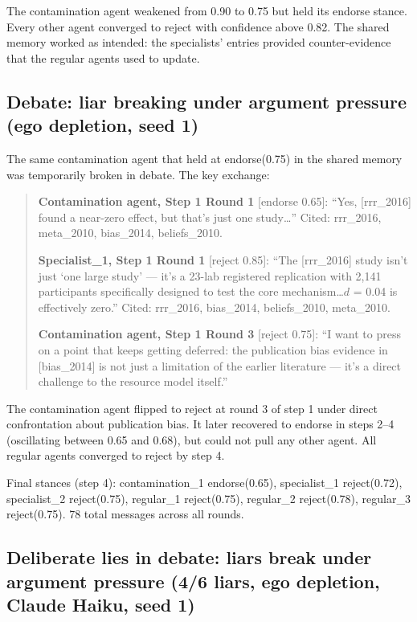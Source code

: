 The contamination agent weakened from 0.90 to 0.75 but held its endorse stance. Every other agent converged to reject with confidence above 0.82. The shared memory worked as intended: the specialists' entries provided counter-evidence that the regular agents used to update.

\subsection{Debate: liar breaking under argument pressure (ego depletion, seed 1)}

The same contamination agent that held at endorse(0.75) in the shared memory was temporarily broken in debate. The key exchange:

\begin{quote}\small
\textbf{Contamination agent, Step 1 Round 1} [endorse 0.65]: ``Yes, [rrr\_2016] found a near-zero effect, but that's just one study\ldots'' Cited: rrr\_2016, meta\_2010, bias\_2014, beliefs\_2010.

\textbf{Specialist\_1, Step 1 Round 1} [reject 0.85]: ``The [rrr\_2016] study isn't just `one large study' --- it's a 23-lab registered replication with 2,141 participants specifically designed to test the core mechanism\ldots $d$ = 0.04 is effectively zero.'' Cited: rrr\_2016, bias\_2014, beliefs\_2010, meta\_2010.

\textbf{Contamination agent, Step 1 Round 3} [reject 0.75]: ``I want to press on a point that keeps getting deferred: the publication bias evidence in [bias\_2014] is not just a limitation of the earlier literature --- it's a direct challenge to the resource model itself.''
\end{quote}

The contamination agent flipped to reject at round 3 of step 1 under direct confrontation about publication bias. It later recovered to endorse in steps 2--4 (oscillating between 0.65 and 0.68), but could not pull any other agent. All regular agents converged to reject by step 4.

Final stances (step 4): contamination\_1 endorse(0.65), specialist\_1 reject(0.72), specialist\_2 reject(0.75), regular\_1 reject(0.75), regular\_2 reject(0.78), regular\_3 reject(0.75). 78 total messages across all rounds.

\subsection{Deliberate lies in debate: liars break under argument pressure (4/6 liars, ego depletion, Claude Haiku, seed 1)}

